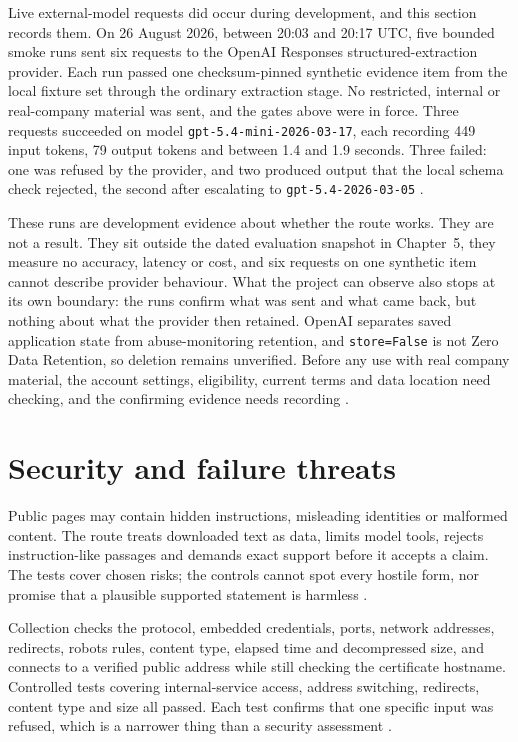 Live external-model requests did occur during development, and this section records them. On
26 August 2026, between 20:03 and 20:17 UTC, five bounded smoke runs sent six requests to the OpenAI
Responses structured-extraction provider. Each run passed one checksum-pinned synthetic evidence item
from the local fixture set through the ordinary extraction stage. No restricted, internal or
real-company material was sent, and the gates above were in force. Three requests succeeded on model
\texttt{gpt-5.4-mini-2026-03-17}, each recording 449 input tokens, 79 output tokens and between 1.4
and 1.9 seconds. Three failed: one was refused by the provider, and two produced output that the local
schema check rejected, the second after escalating to \texttt{gpt-5.4-2026-03-05}
\citep{cddo2023genai,nist2023airmf}.

These runs are development evidence about whether the route works. They are not a result. They sit
outside the dated evaluation snapshot in Chapter~5, they measure no accuracy, latency or cost, and six
requests on one synthetic item cannot describe provider behaviour. What the project can observe also
stops at its own boundary: the runs confirm what was sent and what came back, but nothing about what
the provider then retained. OpenAI separates saved application state from abuse-monitoring retention,
and \texttt{store=False} is not Zero Data Retention, so deletion remains unverified. Before any use
with real company material, the account settings, eligibility, current terms and data location need
checking, and the confirming evidence needs recording
\citep{openai2026datacontrols,cddo2023genai}.
\section{Security and failure threats}

Public pages may contain hidden instructions, misleading identities or malformed content. The route
treats downloaded text as data, limits model tools, rejects instruction-like passages and demands
exact support before it accepts a claim. The tests cover chosen risks; the controls cannot spot every
hostile form, nor promise that a plausible supported statement is harmless
\citep{greshake2023indirect,autio2024genai}.

Collection checks the protocol, embedded credentials, ports, network addresses, redirects, robots
rules, content type, elapsed time and decompressed size, and connects to a verified public address
while still checking the certificate hostname. Controlled tests covering internal-service access,
address switching, redirects, content type and size all passed. Each test confirms that one specific
input was refused, which is a narrower thing than a security assessment
\citep{autio2024genai,nist2023airmf}.

